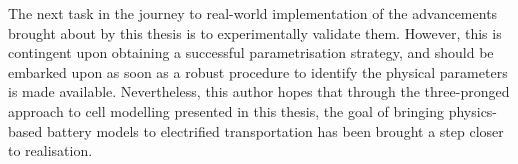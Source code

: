 The next task in the journey to real-world implementation of the advancements
brought about by this thesis is to  experimentally validate them. However, this
is contingent upon obtaining a successful parametrisation strategy, and should
be embarked upon as soon as a robust procedure to identify the physical
parameters is made available. Nevertheless, this author hopes that through the
three-pronged approach to cell modelling presented in this thesis, the goal of
bringing physics-based battery models to electrified transportation has been
brought a step closer to realisation.

